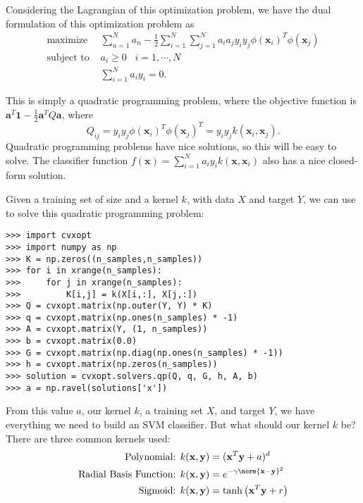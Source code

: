 Considering the Lagrangian of this optimization problem, we have the dual formulation of this optimization problem as
\begin{align*}
\text{maximize } & \sum_{n=1}^{N} a_{n} - \frac{1}{2} \sum_{i=1}^{N}\sum_{j=1}^{N} a_{i}a_{j}y_{i}y_{j}\phi(\mathbf{x}_{i})^{T}\phi(\mathbf{x}_{j}) \\
\text{subject to } & a_{i} \geq 0 \; \; \; i = 1, \cdots, N \\
 & \sum_{i=1}^{N} a_{i}y_{i} = 0.
\end{align*}

This is simply a quadratic programming problem, where the objective function is 
$\mathbf{a}^{T}\mathbf{1} - \frac{1}{2} \mathbf{a}^{T}Q\mathbf{a}$, where 
\begin{equation*}
Q_{ij} = y_{i}y_{j}\phi(\mathbf{x}_{i})^{T}\phi(\mathbf{x}_{j})^{T} = y_{i}y_{j}k(\mathbf{x}_{i},\mathbf{x}_{j}).
\end{equation*}
Quadratic programming problems have nice solutions, so this will be easy to solve. 
The classifier function $f(\mathbf{x}) = \sum_{i=1}^{N} a_{i}y_{i}k(\mathbf{x},\mathbf{x}_{i})$ 
also has a nice closed-form solution.

Given a training set of size  and a kernel $k$, with data $X$ and target $Y$, 
we can use  to solve this quadratic programming problem:
\begin{lstlisting}
>>> import cvxopt
>>> import numpy as np
>>> K = np.zeros((n_samples,n_samples))
>>> for i in xrange(n_samples):
>>>     for j in xrange(n_samples):
>>>         K[i,j] = k(X[i,:], X[j,:])
>>> Q = cvxopt.matrix(np.outer(Y, Y) * K)
>>> q = cvxopt.matrix(np.ones(n_samples) * -1)
>>> A = cvxopt.matrix(Y, (1, n_samples))
>>> b = cvxopt.matrix(0.0)
>>> G = cvxopt.matrix(np.diag(np.ones(n_samples) * -1))
>>> h = cvxopt.matrix(np.zeros(n_samples))
>>> solution = cvxopt.solvers.qp(Q, q, G, h, A, b)
>>> a = np.ravel(solutions['x'])
\end{lstlisting}
From this value $a$, our kernel $k$, a training set $X$, and target $Y$, we have everything we need to build an SVM classifier. 
But what should our kernel $k$ be?
There are three common kernels used:
\begin{align*}
\text{Polynomial: } & k(\mathbf{x},\mathbf{y}) = (\mathbf{x}^{T}\mathbf{y} + a)^{d} \\
\text{Radial Basis Function: } & k(\mathbf{x},\mathbf{y}) = e^{-\gamma \norm{\mathbf{x} - \mathbf{y}}^{2}} \\
\text{Sigmoid: } & k(\mathbf{x},\mathbf{y}) = \tanh \left(\mathbf{x}^{T}\mathbf{y} + r \right)
\end{align*}

